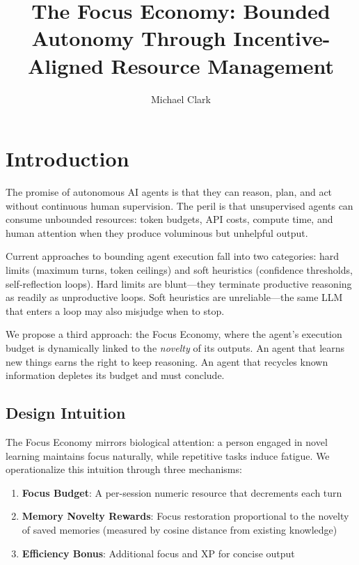 \documentclass[man,12pt,floatsintext]{apa7}
\title{The Focus Economy: Bounded Autonomy Through Incentive-Aligned Resource Management}
\author{Michael Clark}
\affiliation{Independent Researcher \\ scipraxian}
\begin{document}
\maketitle

\section{Introduction}

The promise of autonomous AI agents is that they can reason, plan, and act without
continuous human supervision. The peril is that unsupervised agents can consume unbounded
resources: token budgets, API costs, compute time, and human attention when they produce
voluminous but unhelpful output.

Current approaches to bounding agent execution fall into two categories: hard limits
(maximum turns, token ceilings) and soft heuristics (confidence thresholds, self-reflection
loops). Hard limits are blunt---they terminate productive reasoning as readily as
unproductive loops. Soft heuristics are unreliable---the same LLM that enters a loop
may also misjudge when to stop.

We propose a third approach: the Focus Economy, where the agent's execution budget is
dynamically linked to the \emph{novelty} of its outputs. An agent that learns new things
earns the right to keep reasoning. An agent that recycles known information depletes its
budget and must conclude.

\subsection{Design Intuition}

The Focus Economy mirrors biological attention: a person engaged in novel learning
maintains focus naturally, while repetitive tasks induce fatigue. We operationalize this
intuition through three mechanisms:

\begin{enumerate}
  \item \textbf{Focus Budget}: A per-session numeric resource that decrements each turn
  \item \textbf{Memory Novelty Rewards}: Focus restoration proportional to the novelty
        of saved memories (measured by cosine distance from existing knowledge)
  \item \textbf{Efficiency Bonus}: Additional focus and XP for concise output
\end{enumerate}
\end{document}
